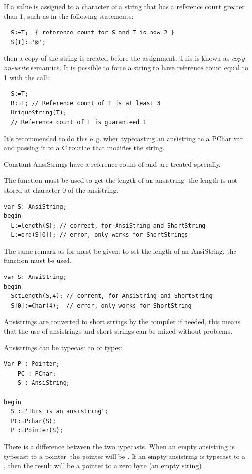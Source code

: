 If a value is assigned to a character of a string that has a reference count
greater than 1, such as in the following
statements:
\begin{verbatim}
  S:=T;  { reference count for S and T is now 2 }
  S[I]:='@';
\end{verbatim}
then a copy of the string is created before the assignment. This is known
as {\em copy-on-write} semantics. It is possible to force a string to have
reference count equal to 1 with the  call:
\begin{verbatim}
  S:=T;
  R:=T; // Reference count of T is at least 3
  UniqueString(T);
  // Reference count of T is guaranteed 1
\end{verbatim}
It's recommended to do this e.\,g. when typecasting an ansistring to a PChar var
and passing it to a C routine that modifies the string.

Constant AnsiStrings have a reference count of  and are treated specially.

The  function must be used to get the length of an
ansistring: the length is not stored at character 0 of the ansistring.
\begin{verbatim}
var S: AnsiString;
begin
  L:=length(S); // correct, for AnsiString and ShortString
  L:=ord(S[0]); // error, only works for ShortStrings
\end{verbatim}


The same remark as for  must be given:
to set the length of an AnsiString, the  function must be used.
\begin{verbatim}
var S: AnsiString;
begin
  SetLength(S,4); // corrent, for AnsiString and ShortString
  S[0]:=Char(4);  // error, only works for ShortString
\end{verbatim}

Ansistrings are converted to short strings by the compiler if needed,
this means that the use of ansistrings and short strings can be mixed
without problems.

Ansistrings can be typecast to  or  types:
\begin{verbatim}
Var P : Pointer;
    PC : PChar;
    S : AnsiString;

begin
  S :='This is an ansistring';
  PC:=Pchar(S);
  P :=Pointer(S);
\end{verbatim}
There is a difference between the two typecasts. When an empty
ansistring is typecast to a pointer, the pointer will be . If an
empty ansistring is typecast to a , then the result will be a pointer to a
zero byte (an empty string).

